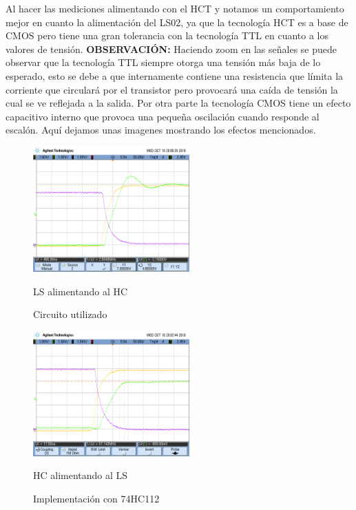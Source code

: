Al hacer las mediciones alimentando con el HCT y notamos un comportamiento mejor en cuanto la alimentaci\'on del LS02, ya que la tecnolog\'ia HCT es a base de CMOS pero tiene una gran tolerancia con la tecnolog\'ia TTL en cuanto a los valores de tensi\'on.
\newline
\textbf{OBSERVACI\'ON:} Haciendo zoom en las señales se puede observar que la tecnolog\'ia TTL siempre otorga una tensi\'on m\'as baja de lo esperado, esto se debe a que internamente contiene una resistencia que l\'imita la corriente que circular\'a por el transistor pero provocar\'a una ca\'ida de tensi\'on la cual se ve reflejada a la salida. Por otra parte la tecnolog\'ia CMOS tiene un efecto capacitivo interno que provoca una pequeña oscilaci\'on cuando responde al escal\'on. Aqu\'i dejamos unas imagenes mostrando los efectos mencionados.

\begin{figure}[H]
\begin{center}
  \begin{minipage}[b]{0.4\textwidth}
  	\begin{center}
  		\includegraphics[width=6cm]{ejercicio2/OSC_LS_HC.png}
		\caption{LS alimentando al HC}
  	\end{center}
  \caption{Circuito utilizado}
  \label{7_fig1}
  \end{minipage}
  \begin{minipage}[b]{0.4\textwidth}
    \begin{center}
  		\includegraphics[width=6cm]{ejercicio2/OSC_HC_LS.png}
		\caption{HC alimentando al LS}
	\end{center}
  \caption{Implementaci\'on con 74HC112}
  \label{7_fig2}
 \end{minipage}
\end{center}
\end{figure}


